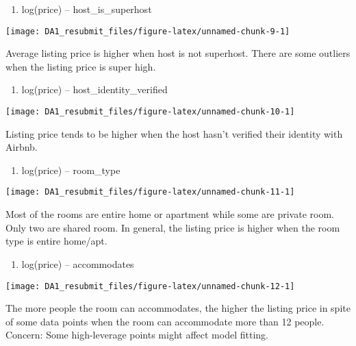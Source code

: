 \documentclass[
]{article}
\providecommand{\tightlist}{%
  \setlength{\itemsep}{0pt}\setlength{\parskip}{0pt}}
\begin{document}
\begin{enumerate}
\def\labelenumi{\arabic{enumi}.}
\setcounter{enumi}{1}
\tightlist
\item
  log(price) -- host\_is\_superhost
\end{enumerate}

\begin{center}\texttt{[image: DA1\_resubmit\_files/figure-latex/unnamed-chunk-9-1]} \end{center}

Average listing price is higher when host is not superhost. There are
some outliers when the listing price is super high.

\begin{enumerate}
\def\labelenumi{\arabic{enumi}.}
\setcounter{enumi}{2}
\tightlist
\item
  log(price) -- host\_identity\_verified
\end{enumerate}

\begin{center}\texttt{[image: DA1\_resubmit\_files/figure-latex/unnamed-chunk-10-1]} \end{center}

Listing price tends to be higher when the host hasn't verified their
identity with Airbnb.

\begin{enumerate}
\def\labelenumi{\arabic{enumi}.}
\setcounter{enumi}{3}
\tightlist
\item
  log(price) -- room\_type
\end{enumerate}

\begin{center}\texttt{[image: DA1\_resubmit\_files/figure-latex/unnamed-chunk-11-1]} \end{center}

Most of the rooms are entire home or apartment while some are private
room. Only two are shared room. In general, the listing price is higher
when the room type is entire home/apt.

\begin{enumerate}
\def\labelenumi{\arabic{enumi}.}
\setcounter{enumi}{4}
\tightlist
\item
  log(price) -- accommodates
\end{enumerate}

\begin{center}\texttt{[image: DA1\_resubmit\_files/figure-latex/unnamed-chunk-12-1]} \end{center}

The more people the room can accommodates, the higher the listing price
in spite of some data points when the room can accommodate more than 12
people.\\
Concern: Some high-leverage points might affect model fitting.
\end{document}

